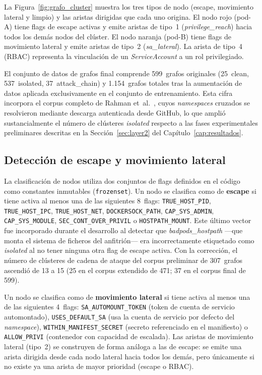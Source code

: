 La Figura~\ref{fig:grafo_cluster} muestra los tres tipos de nodo (escape, movimiento
lateral y limpio) y las aristas dirigidas que cada uno origina. El nodo rojo (pod-A) tiene
flags de escape activas y emite aristas de tipo~1 (\textit{privilege\_reach}) hacia
todos los demás nodos del clúster. El nodo naranja (pod-B) tiene flags de
movimiento lateral y emite aristas de tipo~2 (\textit{sa\_lateral}). La arista de
tipo~4 (\ac{RBAC}) representa la vinculación de un \textit{ServiceAccount} a un rol
privilegiado.

El conjunto de datos de grafos final comprende 599~grafos originales (25~clean, 537~isolated,
37~attack\_chain) y 1.154~grafos totales tras la aumentación de datos aplicada
exclusivamente en el conjunto de entrenamiento. Esta cifra incorpora el corpus
completo de Rahman et~al.\ \citep{Rahman2022}, cuyos \textit{namespaces} cruzados
se resolvieron mediante descarga autenticada desde GitHub, lo que amplió
sustancialmente el número de clústeres \textit{isolated} respecto a las fases
experimentales preliminares descritas en la Sección~\ref{sec:layer2} del
Capítulo~\ref{cap:resultados}.

\subsection{Detección de escape y movimiento lateral}

{\raggedright
La clasificación de nodos utiliza dos conjuntos de flags definidos en el código
como constantes inmutables (\texttt{frozenset}). Un nodo se clasifica como de
\textbf{escape} si tiene activa al menos una de las siguientes 8~flags:
\texttt{TRUE\_HOST\_PID}, \texttt{TRUE\_HOST\_IPC}, \texttt{TRUE\_HOST\_NET},
\texttt{DOCKERSOCK\_PATH}, \texttt{CAP\_SYS\_ADMIN}, \texttt{CAP\_SYS\_MODULE},
\texttt{SEC\_CONT\_OVER\_PRIVIL} o \texttt{HOSTPATH\_MOUNT}. Este último vector fue
incorporado durante el desarrollo al detectar que \textit{badpods\_hostpath} —que monta
el sistema de ficheros del anfitrión— era incorrectamente etiquetado como
\textit{isolated} al no tener ninguna otra flag de escape activa. Con la corrección,
el número de clústeres de cadena de ataque del corpus preliminar de 307~grafos
ascendió de 13 a 15 (25 en el corpus extendido de 471; 37 en el corpus final de 599).\par}

Un nodo se clasifica como de \textbf{movimiento lateral} si tiene activa al menos una
de las siguientes 4~flags: \texttt{SA\_AUTOMOUNT\_TOKEN} (token de cuenta de servicio
automontado), \texttt{USES\_DEFAULT\_SA} (usa la cuenta de servicio por defecto del
\textit{namespace}), \texttt{WITHIN\_MANIFEST\_SECRET} (secreto referenciado en el
manifiesto) o \texttt{ALLOW\_PRIVI} (contenedor con capacidad de escalada). Las aristas
de movimiento lateral (tipo~2) se construyen de forma análoga a las de escape: se emite
una arista dirigida desde cada nodo lateral hacia todos los demás, pero únicamente si
no existe ya una arista de mayor prioridad (escape o \ac{RBAC}).


